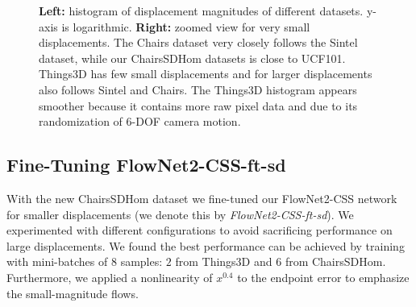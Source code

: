 \documentclass[10pt,twocolumn,letterpaper]{article}%
\newcommand{\chairsSD}{\mbox{ChairsSDHom}\xspace}
\newcommand{\chairs}{\mbox{Chairs}\xspace}
\newcommand{\things}{\mbox{Things3D}\xspace}
\newcommand{\FN}[1]{\mbox{FlowNet2-#1}\xspace}
\begin{document}
\begin{figure}%
  \begin{center}%
    
  \end{center}%
  \caption{
      \textbf{Left:} histogram of displacement magnitudes of different datasets. y-axis is logarithmic. \textbf{Right:} zoomed view for very small displacements. The \chairs dataset very closely follows the Sintel dataset, while our \chairsSD datasets is close to UCF101. \things has few small displacements and for larger displacements also follows Sintel and \chairs. The \things histogram appears smoother because it contains more raw pixel data and due to its randomization of 6-DOF camera motion.
  }%
  \label{fig:displacements_histograms_plot}%
\end{figure}%


\subsection{Fine-Tuning FlowNet2-CSS-ft-sd}

With the new \chairsSD dataset we fine-tuned our \FN{CSS} network for smaller displacements (we denote this by \textit{\mbox{\FN{CSS-ft-sd}}}). We experimented with different configurations to avoid sacrificing  performance on large displacements. We found the best performance can be achieved by training with mini-batches of $8$ samples: $2$ from \things and $6$ from \chairsSD. Furthermore, we applied a nonlinearity of $x^{0.4}$ to the endpoint error to emphasize the small-magnitude flows.
\end{document}
